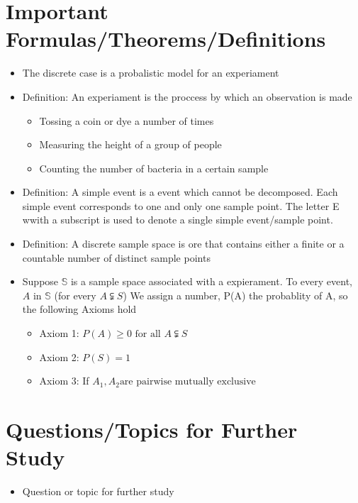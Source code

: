 \documentclass[12pt,a4paper]{article}
\begin{document}
\section{Important Formulas/Theorems/Definitions}
\begin{tcolorbox}[colback=blue!5!white,colframe=blue!75!black,title=Key Formula/Theorem]
  \begin{itemize}
    \item The discrete case is a probalistic model for an experiament
    \item Definition: An experiament is the proccess by which an observation is made 
      \begin{itemize}
        \item Tossing a coin or dye a number of times 
        \item Measuring the height of a group of people 
        \item Counting the number of bacteria in a certain sample 
      \end{itemize}
    \item Definition: A simple event is a event which cannot be decomposed. Each simple event corresponds to one and only one sample point. The letter E wwith a subscript is used to denote a single simple event/sample point.
    \item Definition: A discrete sample space is ore that contains either a finite or a countable number of distinct sample points 
    \item Suppose \( \mathbb{S} \) is a sample space associated with a expierament. To every event, \( A \) in \( \mathbb{S} \) (for every \( A \subsetneqq S \)) We assign a number, P(A) the probablity of A, so the following Axioms hold 
      \begin{itemize}
        \item Axiom 1: \( P(A) \geq 0 \text{ for all } A \subsetneqq S \)
        \item Axiom 2: \( P(S) = 1 \)
        \item Axiom 3: If \( A_{1}, A_{2} \text{are pairwise mutually exclusive } \)
      \end{itemize}
  \end{itemize}
\end{tcolorbox}

\section{Questions/Topics for Further Study}
\begin{itemize}
  \item Question or topic for further study
\end{itemize}
\end{document}
